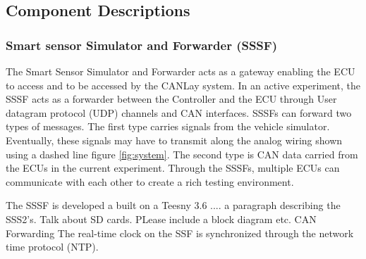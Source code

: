 \documentclass[letterpaper,twocolumn,12pt]{article}
\begin{document}


\subsection{Component Descriptions}
\subsubsection{Smart sensor Simulator and Forwarder (SSSF)}
The Smart Sensor Simulator and Forwarder acts as a gateway enabling the ECU to access and to be accessed by the CANLay system. 
In an active experiment, the SSSF acts as a forwarder between the Controller and the ECU through User datagram protocol (UDP) channels and CAN interfaces. SSSFs can forward two types of messages. 
The first type carries signals from the vehicle simulator. Eventually, these signals may have to transmit along the analog wiring shown using a dashed line figure \ref{fig:system}.  
The second type is CAN data carried from the ECUs in the current experiment. Through the SSSFs, multiple ECUs can communicate with each other to create a rich testing environment.

The SSSF is developed a built on a Teesny 3.6 .... a paragraph describing the SSS2's. Talk about SD cards. PLease include a block diagram etc.
CAN Forwarding 
The real-time clock on the SSF is synchronized through the network time protocol (NTP).
\end{document}
